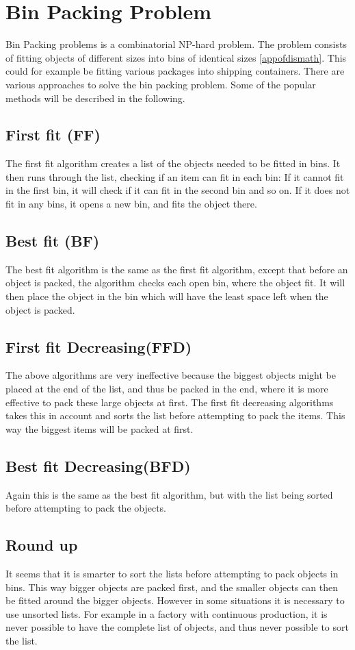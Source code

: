 \section{Bin Packing Problem}
\label{sec:binpacking}
Bin Packing problems is a combinatorial NP-hard problem. The problem consists of fitting objects of different sizes into bins of identical sizes \ref{appofdismath}. This could for example be fitting various packages into shipping containers. There are various approaches to solve the bin packing problem. Some of the popular methods will be described in the following. 

\subsection{First fit (FF)}
The first fit algorithm creates a list of the objects needed to be fitted in bins. It then runs through the list, checking if an item can fit in each bin: If it cannot fit in the first bin, it will check if it can fit in the second bin and so on. If it does not fit in any bins, it opens a new bin, and fits the object there. 

\subsection{Best fit (BF)}
The best fit algorithm is the same as the first fit algorithm, except that before an object is packed, the algorithm checks each open bin, where the object fit. It will then place the object in the bin which will have the least space left when the object is packed. 

\subsection{First fit Decreasing(FFD)}
The above algorithms are very ineffective because the biggest objects might be placed at the end of the list, and thus be packed in the end, where it is more effective to pack these large objects at first.
The first fit decreasing algorithms takes this in account and sorts the list before attempting to pack the items. This way the biggest items will be packed at first.

\subsection{Best fit Decreasing(BFD)}
Again this is the same as the best fit algorithm, but with the list being sorted before attempting to pack the objects.

\subsection{Round up}
It seems that it is smarter to sort the lists before attempting to pack objects in bins. This way bigger objects are packed first, and the smaller objects can then be fitted around the bigger objects. However in some situations it is necessary to use unsorted lists. For example in a factory with continuous production, it is never possible to have the complete list of objects, and thus never possible to sort the list.

